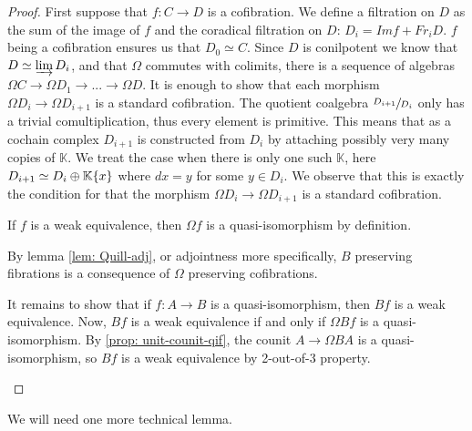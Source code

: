 \documentclass[../thesis.tex]{subfiles}
\begin{document}
            \begin{proof}
                First suppose that $f : C\rightarrow D$ is a cofibration. We define a filtration on $D$ as the sum of the image of $f$ and the coradical filtration on $D$: $D_i = Imf + Fr_iD$. $f$ being a cofibration ensures us that $D_0 \simeq C$. Since $D$ is conilpotent we know that $D \simeq \varinjlim D_i$, and that $\Omega$ commutes with colimits, there is a sequence of algebras $\Omega C \rightarrow \Omega D_1 \rightarrow ... \rightarrow \Omega D$. It is enough to show that each morphism $\Omega D_i \rightarrow \Omega D_{i+1}$ is a standard cofibration. The quotient coalgebra $\sfrac{D_{i+1}}{D_i}$ only has a trivial comultiplication, thus every element is primitive. This means that as a cochain complex $D_{i+1}$ is constructed from $D_i$ by attaching possibly very many copies of $\mathbb{K}$. We treat the case when there is only one such $\mathbb{K}$, here $D_{i+1} \simeq D_i \oplus \mathbb{K}\{x\}$ where $dx = y$ for some $y\in D_i$. We observe that this is exactly the condition for that the morphism $\Omega D_i \rightarrow \Omega D_{i+1}$ is a standard cofibration.

                If $f$ is a weak equivalence, then $\Omega f$ is a quasi-isomorphism by definition.

                By lemma \ref{lem: Quill-adj}, or adjointness more specifically, $B$ preserving fibrations is a consequence of $\Omega$ preserving cofibrations.

                It remains to show that if $f: A\rightarrow B$ is a quasi-isomorphism, then $Bf$ is a weak equivalence. Now, $Bf$ is a weak equivalence if and only if $\Omega Bf$ is a quasi-isomorphism. By \ref{prop: unit-counit-qif}, the counit $A \rightarrow \Omega BA$ is a quasi-isomorphism, so $Bf$ is a weak equivalence by 2-out-of-3 property.

                \begin{center}
                \end{center}
            \end{proof}

            We will need one more technical lemma.
\end{document}
